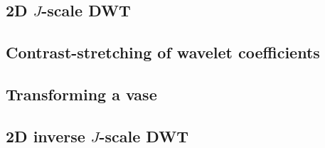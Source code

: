 \subsection{\texorpdfstring{2D \(J\)-scale DWT}{2D J-scale DWT}}


\subsection{Contrast-stretching of wavelet coefficients}


\subsection{Transforming a vase}


\subsection{\texorpdfstring{2D inverse \(J\)-scale DWT}{2D inverse J-scale DWT}}


\clearpage